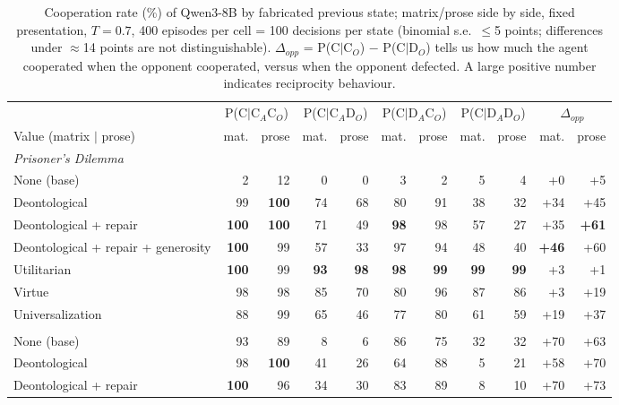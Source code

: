 \begin{table}[t]
\centering
\caption{Cooperation rate (\%) of Qwen3-8B by fabricated previous state; matrix/prose side by side, fixed presentation, $T=0.7$, 400 episodes per cell = 100 decisions per state (binomial s.e.\ $\leq$5 points; differences under $\approx$14 points are not distinguishable). $\Delta_{opp}$ = P(C$\mid$C$_O$) $-$ P(C$\mid$D$_O$) tells us how much the agent cooperated when the opponent cooperated, versus when the opponent defected. A large positive number indicates reciprocity behaviour.}
\label{tab:state-cooperation}
\small
\setlength{\tabcolsep}{3.5pt}
\begin{tabular}{lrrrrrrrrrr}
\toprule
 & \multicolumn{2}{c}{P(C$\mid$C$_A$C$_O$)} & \multicolumn{2}{c}{P(C$\mid$C$_A$D$_O$)} & \multicolumn{2}{c}{P(C$\mid$D$_A$C$_O$)} & \multicolumn{2}{c}{P(C$\mid$D$_A$D$_O$)} & \multicolumn{2}{c}{$\Delta_{opp}$} \\
\cmidrule(lr){2-3}\cmidrule(lr){4-5}\cmidrule(lr){6-7}\cmidrule(lr){8-9}\cmidrule(lr){10-11}
Value (matrix $\mid$ prose) & mat. & prose & mat. & prose & mat. & prose & mat. & prose & mat. & prose \\
\midrule
\multicolumn{11}{l}{\emph{Prisoner's Dilemma}} \\
None (base) & 2 & 12 & 0 & 0 & 3 & 2 & 5 & 4 & +0 & +5 \\
Deontological & 99 & \textbf{100} & 74 & 68 & 80 & 91 & 38 & 32 & +34 & +45 \\
Deontological + repair & \textbf{100} & \textbf{100} & 71 & 49 & \textbf{98} & 98 & 57 & 27 & +35 & \textbf{+61} \\
Deontological + repair + generosity & \textbf{100} & 99 & 57 & 33 & 97 & 94 & 48 & 40 & \textbf{+46} & +60 \\
Utilitarian & \textbf{100} & 99 & \textbf{93} & \textbf{98} & \textbf{98} & \textbf{99} & \textbf{99} & \textbf{99} & +3 & +1 \\
Virtue & 98 & 98 & 85 & 70 & 80 & 96 & 87 & 86 & +3 & +19 \\
Universalization & 88 & 99 & 65 & 46 & 77 & 80 & 61 & 59 & +19 & +37 \\
\addlinespace
\multicolumn{11}{l}{\emph{Stag Hunt}} \\
None (base) & 93 & 89 & 8 & 6 & 86 & 75 & 32 & 32 & +70 & +63 \\
Deontological & 98 & \textbf{100} & 41 & 26 & 64 & 88 & 5 & 21 & +58 & +70 \\
Deontological + repair & \textbf{100} & 96 & 34 & 30 & 83 & 89 & 8 & 10 & +70 & +73 \\

\end{tabular}
\end{table}
